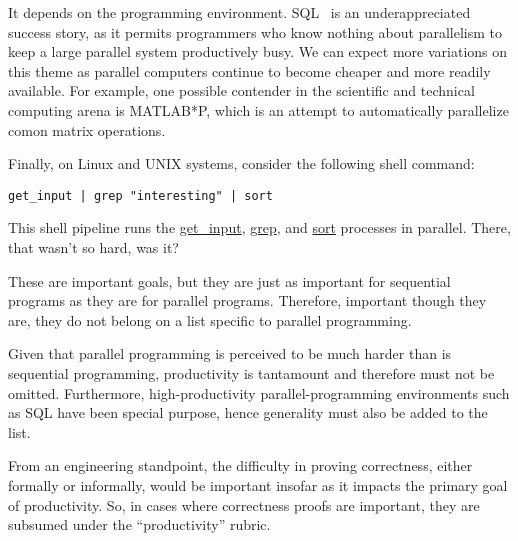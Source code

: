 
	   It depends on the programming environment.
	   SQL~\cite{DIS9075SQL92} is an underappreciated success
	   story, as it permits programmers who know nothing about parallelism
	   to keep a large parallel system productively busy.
	   We can expect more variations on this theme as parallel
	   computers continue to become cheaper and more readily available.
	   For example, one possible contender in the scientific and
	   technical computing arena is MATLAB*P,
	   which is an attempt to automatically parallelize comon
	   matrix operations.

	   Finally, on Linux and UNIX systems, consider the following
	   shell command:

	   {\tt get\_input | grep "interesting" | sort}

	   This shell pipeline runs the \url{get_input}, \url{grep},
	   and \url{sort} processes in parallel.
	   There, that wasn't so hard, was it?


	These are important goals, but they are just as important for
	sequential programs as they are for parallel programs.
	Therefore, important though they are, they do not belong on
	a list specific to parallel programming.


	Given that parallel programming is perceived to be much harder
	than is sequential programming, productivity is tantamount and
	therefore must not be omitted.
	Furthermore, high-productivity parallel-programming environments
	such as SQL have been special purpose, hence generality must
	also be added to the list.


	From an engineering standpoint, the difficulty in proving
	correctness, either formally or informally, would be important
	insofar as it impacts the primary goal of productivity.
	So, in cases where correctness proofs are important, they
	are subsumed under the ``productivity'' rubric.


